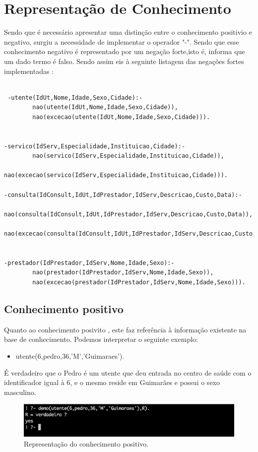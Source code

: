 \documentclass[25pt]{article}
\begin{document}
\newpage


\section{Representação de Conhecimento}

Sendo que é necessário apresentar uma distinção entre o conhecimento positivio e negativo, surgiu
a necessidade de implementar o operador "-". Sendo que esse conhecimento negativo é representado por um negação
forte,isto é, informa que um dado termo é falso.\newline
Sendo assim eis à seguinte listagem das negações fortes implementadas :
\begin{lstlisting}

 -utente(IdUt,Nome,Idade,Sexo,Cidade):-
        nao(utente(IdUt,Nome,Idade,Sexo,Cidade)),
        nao(excecao(utente(IdUt,Nome,Idade,Sexo,Cidade))).


-servico(IdServ,Especialidade,Instituicao,Cidade):-
        nao(servico(IdServ,Especialidade,Instituicao,Cidade)),
        nao(excecao(servico(IdServ,Especialidade,Instituicao,Cidade))).

-consulta(IdConsult,IdUt,IdPrestador,IdServ,Descricao,Custo,Data):-
 nao(consulta(IdConsult,IdUt,IdPrestador,IdServ,Descricao,Custo,Data)),
 nao(excecao(consulta(IdConsult,IdUt,IdPrestador,IdServ,Descricao,Custo,Data))).


-prestador(IdPrestador,IdServ,Nome,Idade,Sexo):-
        nao(prestador(IdPrestador,IdServ,Nome,Idade,Sexo)),
        nao(excecao(prestador(IdPrestador,IdServ,Nome,Idade,Sexo))).

\end{lstlisting}

\subsection{Conhecimento positivo}

Quanto ao conhecimento posivito , este faz referência à informação existente na base de conhecimento.
Podemos interpretar o seguinte exemplo:
\begin{itemize}
\item utente(6,pedro,36,'M','Guimaraes').
\end{itemize}
 É verdadeiro que o Pedro é um utente que deu entrada no centro de saúde com o identificador igual à 6, e o mesmo reside em Guimarães
e possui o sexo masculino.

\begin{figure}[H]
\centering\includegraphics[scale=0.55]{positivo}
\caption{\label{fig:controller}Representação do conhecimento positivo.}
\end{figure}
\end{document}
